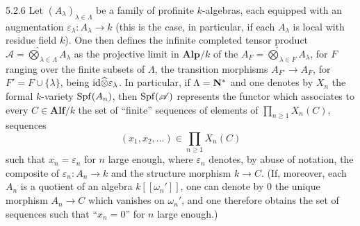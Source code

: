 \begin{definition}{5.2.6}\label{VIIB.5.2.6}
Let $(A_\lambda)_{\lambda\in\Lambda}$ be a family of profinite $k$-algebras, each equipped with an augmentation $\varepsilon_\lambda:A_\lambda\to k$ (this is the case, in particular, if each $A_\lambda$ is local with residue field $k$). One then defines the infinite completed tensor product $\mathscr A=\widehat{\bigotimes}_{\lambda\in\Lambda}A_\lambda$ as the projective limit in $\mathbf{Alp}/k$ of the $A_F=\widehat{\bigotimes}_{\lambda\in F}A_\lambda$, for $F$ ranging over the finite subsets of $\Lambda$, the transition morphisms $A_{F'}\to A_F$, for $F'=F\cup\{\lambda\}$, being $\mathrm{id}\widehat\otimes\varepsilon_\lambda$. In particular, if $\Lambda=\mathbf{N}^*$ and one denotes by $X_n$ the formal $k$-variety $\operatorname{Spf}(A_n)$, then $\operatorname{Spf}(\mathscr A)$ represents the functor which associates to every $C\in\mathbf{Alf}/k$ the set of ``finite'' sequences of elements of $\prod_{n\ge1}X_n(C)$, \ie sequences
\[
(x_1,x_2,\ldots)\in\prod_{n\ge1}X_n(C)
\]
such that $x_n=\varepsilon_n$ for $n$ large enough, where $\varepsilon_n$ denotes, by abuse of notation, the composite of $\varepsilon_n:A_n\to k$ and the structure morphism $k\to C$. (If, moreover, each $A_n$ is a quotient of an algebra $k[[\omega_n']]$, one can denote by $0$ the unique morphism $A_n\to C$ which vanishes on $\omega_n'$, and one therefore obtains the set of sequences such that ``$x_n=0$'' for $n$ large enough.)
\end{definition}

